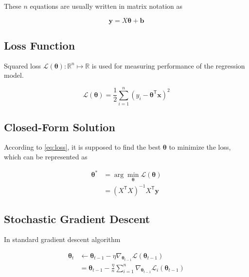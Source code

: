 \documentclass[journal, a4paper]{IEEEtran}
\newcommand{\argmin}{\arg\!\min}
\begin{document}
These $n$ equations are usually written in matrix notation as

\begin{equation}
    \mathbf{y} = X\boldsymbol{\theta} + \mathbf{b}
\end{equation}

\subsection{Loss Function}

Squared loss $\mathcal{L}(\boldsymbol{\theta}):\mathbb{R}^n\mapsto\mathbb{R}$ is used for measuring performance of the regression model.

\begin{equation}\label{eq:loss}
    \mathcal{L}(\boldsymbol{\theta}) = \frac{1}{2}\sum^n_{i=1} (y_i-\boldsymbol\theta^{\mathsf{T}}\mathbf{x})^2
\end{equation}

\subsection{Closed-Form Solution}

According to \eqref{eq:loss}, it is supposed to find the best $\boldsymbol{\theta}$ to minimize the loss, which can be represented as

\begin{equation}\label{eq:closed-form}
    \begin{split}
        \boldsymbol{\theta}^{\ast} & = \argmin_{\boldsymbol{\theta}}\mathcal{L}(\boldsymbol{\theta}) \\
                                   & = \left(X^\mathsf{T}X\right)^{-1}X^\mathsf{T}\mathbf{y}
    \end{split}
\end{equation}

\subsection{Stochastic Gradient Descent}

In standard gradient descent algorithm

\begin{equation}\label{eq:gd}
    \begin{split}
        \boldsymbol\theta_t & \leftarrow \boldsymbol\theta_{t-1} - \eta\nabla_{\boldsymbol\theta_{t-1}}\mathcal{L}(\boldsymbol\theta_{t-1}) \\
                            & = \boldsymbol\theta_{t-1} - \frac{\eta}{n}\sum^{n}_{i=1}\nabla_{\boldsymbol\theta_{t-1}}\mathcal{L}_i(\boldsymbol\theta_{t-1})
    \end{split}
\end{equation}
\end{document}
